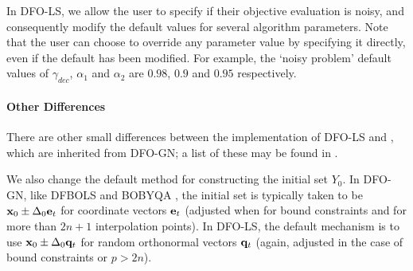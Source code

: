 In DFO-LS, we allow the user to specify if their objective evaluation is noisy, and consequently modify the default values for several algorithm parameters.
Note that the user can choose to override any parameter value by specifying it directly, even if the default has been modified.
For example, the `noisy problem' default values of $\gamma_{dec}$, $\alpha_1$ and $\alpha_2$ are $0.98$, $0.9$ and $0.95$ respectively.

\paragraph{Other Differences}
There are other small differences between the implementation of DFO-LS and , which are inherited from DFO-GN; a list of these may be found in \cite[Section 4.4]{Cartis2017a}.

We also change the default method for constructing the initial set $Y_0$.
In DFO-GN, like DFBOLS \cite{Zhang2010} and BOBYQA \cite{Powell2009}, the initial set is typically taken to be $\mathbf{x}_0\pm \Delta_0\mathbf{e}_t$ for coordinate vectors $\mathbf{e}_t$ (adjusted when for bound constraints and for more than $2n+1$ interpolation points).
In DFO-LS, the default mechanism is to use $\mathbf{x}_0\pm\Delta_0\mathbf{q}_t$ for random orthonormal vectors $\mathbf{q}_t$ (again, adjusted in the case of bound constraints or $p>2n$).



